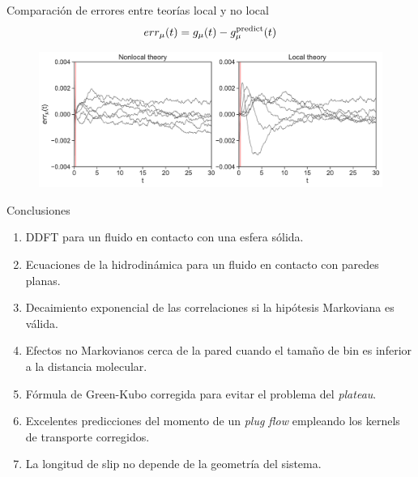 \documentclass{beamer}
\begin{document}
\begin{frame}{Comparación de errores entre teorías local y no local}
  \begin{align}
  err_\mu(t)=  g_\mu(t)-g^{\rm predict}_\mu(t)
    \nonumber
  \end{align}
    \begin{figure}
\includegraphics[width=\linewidth]{errors-17nodes-WALLS-defense}
\end{figure}
\end{frame}

\begin{frame}{Conclusiones}
  \begin{enumerate}
    \item<1-> DDFT para un fluido en contacto con una esfera sólida. 
    \item<2-> Ecuaciones de la hidrodinámica para un fluido en contacto con paredes planas. 
    \item<3-> Decaimiento exponencial de las correlaciones si la hipótesis Markoviana es válida. 
    \item<4-> Efectos no Markovianos cerca de la pared cuando el tamaño de bin es inferior a la distancia molecular. 
    \item<5-> Fórmula de Green-Kubo corregida para evitar el problema del \textit{plateau}.
    \item<6-> Excelentes predicciones del momento de un \textit{plug flow} empleando los kernels de transporte corregidos. 
    \item<7-> La longitud de slip no depende de la geometría del sistema.  
  \end{enumerate}
\end{frame}
\end{document}
